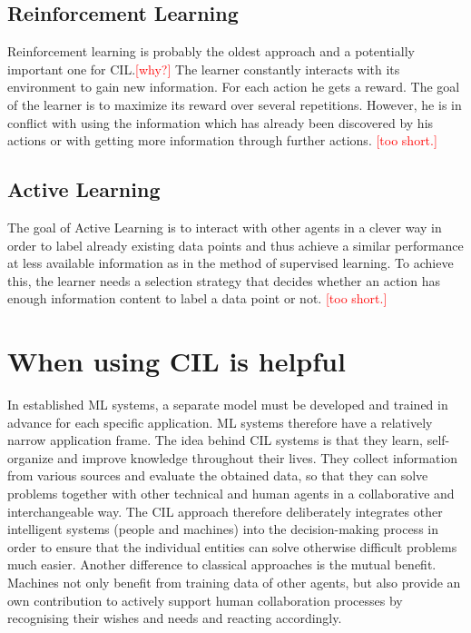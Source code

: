 \documentclass[conference]{IEEEtran}
\newcommand\notes[1]{\textcolor{red}{#1}}
\begin{document}
\subsection{Reinforcement Learning}\label{reinforcement}
Reinforcement learning is probably the oldest approach and a potentially important one for CIL\@.\notes{[why?]} 
The learner constantly interacts with its environment to gain new information. For each action 
he gets a reward. The goal of the learner is to maximize its reward over several repetitions. 
However, he is in conflict with using the information which has already been discovered by his actions 
or with getting more information through further actions.
\notes{[too short.]}

\subsection{Active Learning}\label{active}
The goal of Active Learning is to interact with other agents in a clever way in order 
to label already existing data points and thus achieve a similar performance at less available 
information as in the method of supervised learning. To achieve this, 
the learner needs a selection strategy\cite{ActiveToDedicated:calma} that decides whether 
an action has enough information content to label a data point or not.
\notes{[too short.]}


\section{When using CIL is helpful}\label{AdvantageOfCIL}
In established ML systems, a separate model must be developed and trained in advance for 
each specific application. ML systems therefore have a relatively narrow application frame. 
The idea behind CIL systems is that they learn, self-organize and improve knowledge throughout their lives. 
They collect information from various sources and evaluate the obtained data, so that they 
can solve problems together with other technical and human agents in a 
collaborative and interchangeable way\cite{CIL:sick}.
The CIL approach therefore deliberately integrates other intelligent systems 
(people and machines) into the decision-making process in order to ensure that the individual entities 
can solve otherwise difficult problems much easier.
Another difference to classical approaches is the mutual benefit. 
Machines not only benefit from training data of other agents, but also provide 
an own contribution to actively support human collaboration processes by 
recognising their wishes and needs and reacting accordingly\cite{CIL:sick}.
\end{document}
